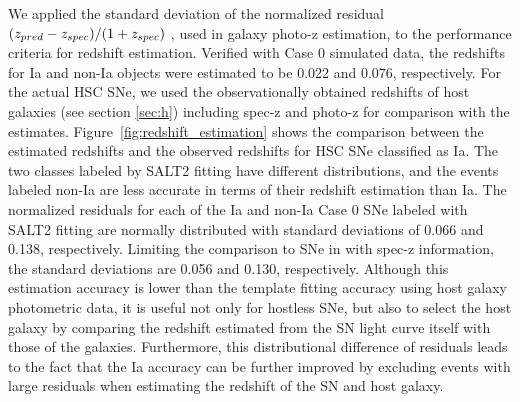 \documentclass[proof]{pasj01}
\providecommand{\DIFadd}[1]{{\protect\color{blue} \sf #1}} %
\providecommand{\DIFdel}[1]{{\protect\color{red} \scriptsize #1}} %
\providecommand{\DIFaddbegin}{\protect\color{blue}} %
\providecommand{\DIFaddend}{\protect\color{black}} %
\providecommand{\DIFdelbegin}{\protect\color{red}} %
\providecommand{\DIFdelend}{\protect\color{black}} %
\newcommand{\DIFscaledelfig}{0.5}
\newlength{\DIFdelgraphicswidth} %
\newlength{\DIFdelgraphicsheight} %
\newcommand{\DIFaddincludegraphics}[2][]{{\color{blue}\fbox{\DIFOincludegraphics[#1]{#2}}}} %
\newcommand{\DIFdelincludegraphics}[2][]{%
\sbox{\DIFdelgraphicsbox}{\DIFOincludegraphics[#1]{#2}}%
\settoboxwidth{\DIFdelgraphicswidth}{\DIFdelgraphicsbox} %
\settoboxtotalheight{\DIFdelgraphicsheight}{\DIFdelgraphicsbox} %
\scalebox{\DIFscaledelfig}{%
\parbox[b]{\DIFdelgraphicswidth}{\usebox{\DIFdelgraphicsbox}\\[-\baselineskip] \rule{\DIFdelgraphicswidth}{0em}}\llap{\resizebox{\DIFdelgraphicswidth}{\DIFdelgraphicsheight}{%
\setlength{\unitlength}{\DIFdelgraphicswidth}%
\begin{picture}(1,1)%
\thicklines\linethickness{2pt} %
{\color[rgb]{1,0,0}\put(0,0){\framebox(1,1){}}}%
{\color[rgb]{1,0,0}\put(0,0){\line( 1,1){1}}}%
{\color[rgb]{1,0,0}\put(0,1){\line(1,-1){1}}}%
\end{picture}%
}\hspace*{3pt}}} %
} %
\DeclareRobustCommand{\DIFaddbegin}{\DIFOaddbegin \let\includegraphics\DIFaddincludegraphics} %
\DeclareRobustCommand{\DIFaddend}{\DIFOaddend \let\includegraphics\DIFOincludegraphics} %
\DeclareRobustCommand{\DIFdelbegin}{\DIFOdelbegin \let\includegraphics\DIFdelincludegraphics} %
\DeclareRobustCommand{\DIFdelend}{\DIFOaddend \let\includegraphics\DIFOincludegraphics} %
\begin{document}
We applied the standard deviation of the normalized residual $(z_{\rm pred}-z_{\rm spec})/(1+z_{\rm spec})$ \citep{Salvato_2009,Salvato_2019}, used in galaxy photo-z estimation, to the performance criteria for redshift estimation.
Verified with Case 0 simulated data, the redshifts for Ia and non-Ia objects were estimated to be 0.022 and 0.076, respectively.
For the actual HSC SNe, we used the observationally obtained redshifts of host galaxies (see section \ref{sec:h}) including spec-z and photo-z for comparison with the estimates.
Figure\ \ref{fig:redshift_estimation} shows the comparison between the estimated redshifts and the observed redshifts for HSC SNe classified as Ia.
The two classes labeled by SALT2 fitting have different distributions, and the events labeled non-Ia are less accurate in terms of their redshift estimation than Ia.
The normalized residuals for each of the Ia and non-Ia Case 0 SNe labeled with SALT2 fitting are normally distributed with standard deviations of 0.066 and 0.138, respectively.
Limiting the comparison to SNe in \DIFdelbegin \DIFdel{the host galaxies }\DIFdelend \DIFaddbegin \DIFadd{a host galaxy }\DIFaddend with spec-z information, the standard deviations are 0.056 and 0.130, respectively.
Although this estimation accuracy is lower than the template fitting accuracy using host galaxy photometric data, it is useful not only for hostless SNe, but also to select the host galaxy by comparing the redshift estimated from the SN light curve itself with those of the galaxies.
Furthermore, this distributional difference of residuals leads to the fact that the Ia accuracy can be further improved by excluding events with large residuals when estimating the redshift of the SN and host galaxy.
%
\end{document}
